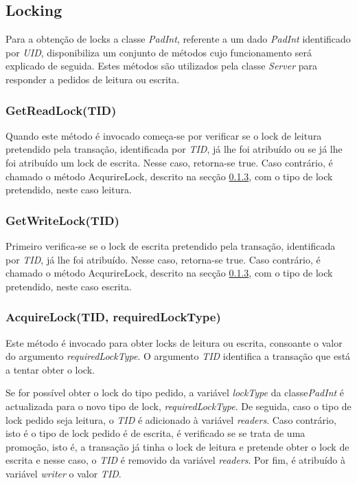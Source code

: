 \subsection{Locking}
Para a obtenção de locks a classe \textit{PadInt}, referente a um dado \textit{PadInt} identificado por \textit{UID}, disponibiliza um conjunto de métodos cujo funcionamento será explicado de seguida. Estes métodos são utilizados pela classe \textit{Server} para responder a pedidos de leitura ou escrita.

\subsubsection{GetReadLock(TID)}
\label{GetReadLock}
Quando este método é invocado começa-se por verificar se o lock de leitura pretendido pela transação, identificada por \textit{TID}, já lhe foi atribuído ou se já lhe foi atribuído um lock de escrita. Nesse caso, retorna-se true. Caso contrário, é chamado o método AcqurireLock, descrito na secção \ref{obterLock}, com o tipo de lock pretendido, neste caso leitura.

\subsubsection{GetWriteLock(TID)}
\label{GetWriteLock}
Primeiro verifica-se se o lock de escrita pretendido pela transação, identificada por \textit{TID}, já lhe foi atribuído. Nesse caso, retorna-se true. Caso contrário, é chamado o método AcqurireLock, descrito na secção \ref{obterLock}, com o tipo de lock pretendido, neste caso escrita.

\subsubsection{AcquireLock(TID, requiredLockType)}
\label{obterLock}
Este método é invocado para obter locks de leitura ou escrita, consoante o valor do argumento \textit{requiredLockType}. O argumento \textit{TID} identifica a transação que está a tentar obter o lock.

Se for possível obter o lock do tipo pedido, a variável \textit{lockType} da classe\textit{PadInt} é actualizada para o novo tipo de lock, \textit{requiredLockType}. De seguida, caso o tipo de lock pedido seja leitura, o \textit{TID} é adicionado à variável \textit{readers}. Caso contrário, isto é o tipo de lock pedido é de escrita, é verificado se se trata de uma promoção, isto é, a transação já tinha o lock de leitura e pretende obter o lock de escrita e nesse caso, o \textit{TID} é removido da variável \textit{readers}. Por fim, é atribuído à variável \textit{writer} o valor \textit{TID}.

